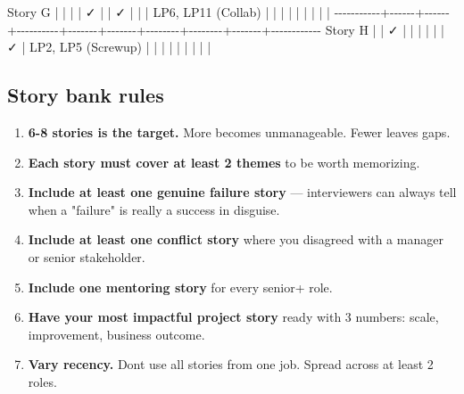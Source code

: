 \documentclass[11pt]{article}
\providecommand{\tightlist}{\setlength{\itemsep}{1pt}\setlength{\parskip}{0pt}}
\newenvironment{Shaded}{\begin{snugshade}}{\end{snugshade}}
\newcommand{\NormalTok}[1]{\textcolor[rgb]{0.81,0.81,0.76}{#1}}
\newcommand{\OperatorTok}[1]{\textcolor[rgb]{0.81,0.81,0.76}{#1}}
\begin{document}
\begin{Shaded}
\begin{Highlighting}[]
\NormalTok{Story G    }\OperatorTok{|}      \OperatorTok{|}      \OperatorTok{|}          \OperatorTok{|}\NormalTok{  ✓    }\OperatorTok{|}       \OperatorTok{|}\NormalTok{  ✓     }\OperatorTok{|}        \OperatorTok{|}       \OperatorTok{|}\NormalTok{ LP6, LP11}
\NormalTok{(Collab)   }\OperatorTok{|}      \OperatorTok{|}      \OperatorTok{|}          \OperatorTok{|}       \OperatorTok{|}       \OperatorTok{|}        \OperatorTok{|}        \OperatorTok{|}       \OperatorTok{|}
\OperatorTok{{-}{-}{-}{-}{-}{-}{-}{-}{-}{-}{-}+{-}{-}{-}{-}{-}{-}+{-}{-}{-}{-}{-}{-}+{-}{-}{-}{-}{-}{-}{-}{-}{-}{-}+{-}{-}{-}{-}{-}{-}{-}+{-}{-}{-}{-}{-}{-}{-}+{-}{-}{-}{-}{-}{-}{-}{-}+{-}{-}{-}{-}{-}{-}{-}{-}+{-}{-}{-}{-}{-}{-}{-}+{-}{-}{-}{-}{-}{-}{-}{-}{-}{-}{-}{-}}
\NormalTok{Story H    }\OperatorTok{|}      \OperatorTok{|}\NormalTok{  ✓   }\OperatorTok{|}          \OperatorTok{|}       \OperatorTok{|}       \OperatorTok{|}        \OperatorTok{|}        \OperatorTok{|}\NormalTok{  ✓    }\OperatorTok{|}\NormalTok{ LP2, LP5}
\NormalTok{(Screwup)  }\OperatorTok{|}      \OperatorTok{|}      \OperatorTok{|}          \OperatorTok{|}       \OperatorTok{|}       \OperatorTok{|}        \OperatorTok{|}        \OperatorTok{|}       \OperatorTok{|}
\end{Highlighting}
\end{Shaded}

\subsection{Story bank rules}\label{story-bank-rules}

\begin{enumerate}
\def\labelenumi{\arabic{enumi}.}
\tightlist
\item
  \textbf{6-8 stories is the target.} More becomes unmanageable. Fewer leaves gaps.
\item
  \textbf{Each story must cover at least 2 themes} to be worth memorizing.
\item
  \textbf{Include at least one genuine failure story} --- interviewers can always tell when a "failure" is really a success in disguise.
\item
  \textbf{Include at least one conflict story} where you disagreed with a manager or senior stakeholder.
\item
  \textbf{Include one mentoring story} for every senior+ role.
\item
  \textbf{Have your most impactful project story} ready with 3 numbers: scale, improvement, business outcome.
\item
  \textbf{Vary recency.} Don\textquotesingle t use all stories from one job. Spread across at least 2 roles.
\end{enumerate}
\end{document}
